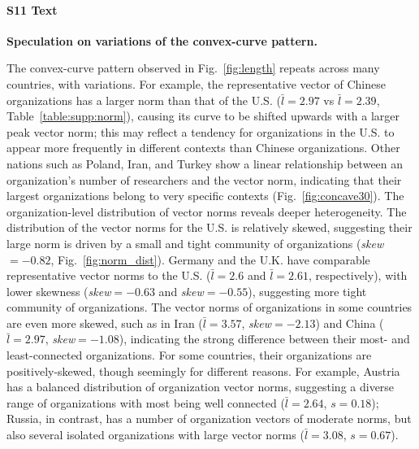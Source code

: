 \documentclass[12pt]{article} %
\begin{document}
%
\paragraph*{S11 Text}
\label{si:text:boomerang_speculation}
{\bf Speculation on variations of the convex-curve pattern.}

The convex-curve pattern observed in Fig.~\ref{fig:length} repeats across many countries, with variations.
For example, the representative vector of Chinese organizations has a larger norm than that of the U.S. ($\bar{l} = 2.97$ vs $\bar{l} = 2.39$, Table~\ref{table:supp:norm}), causing its curve to be shifted upwards with a larger peak vector norm;
this may reflect a tendency for organizations in the U.S. to appear more frequently in different contexts than Chinese organizations.
Other nations such as Poland, Iran, and Turkey show a linear relationship between an organization's number of researchers and the vector norm, indicating that their largest organizations belong to very specific contexts (Fig.~\ref{fig:concave30}).
The organization-level distribution of vector norms reveals deeper heterogeneity.
The distribution of the vector norms for the U.S. is relatively skewed, suggesting their large norm is driven by a small and tight community of organizations (\textit{skew}$ = -0.82$, Fig.~\ref{fig:norm_dist}).
Germany and the U.K. have comparable representative vector norms to the U.S. ($\bar{l} = 2.6$ and $\bar{l} = 2.61$, respectively), with lower skewness (\textit{skew}$ = -0.63$ and \textit{skew}$ = -0.55$), suggesting more tight community of organizations.
The vector norms of organizations in some countries are even more skewed, such as in Iran ($\bar{l} = 3.57$, \textit{skew}$ = -2.13$) and China ($\bar{l} = 2.97$, \textit{skew}$ = -1.08$), indicating the strong difference between their most- and least-connected organizations.
For some countries, their organizations are positively-skewed, though seemingly for different reasons.
For example, Austria has a balanced distribution of organization vector norms, suggesting a diverse range of organizations with most being well connected ($\bar{l} =2.64$, $s = 0.18$);
Russia, in contrast, has a number of organization vectors of moderate norms, but also several isolated organizations with large vector norms ($\bar{l} = 3.08$, $s = 0.67$).


\newpage
\end{document}
